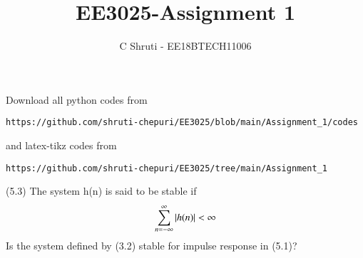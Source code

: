 \documentclass[journal,12pt,twocolumn]{IEEEtran}
\begin{document}
\def\rightbox#1{\makebox[0in][r]{#1}}
\def\centbox#1{\makebox[0in]{#1}}
\def\topbox#1{\raisebox{-\baselineskip}[0in][0in]{#1}}
\def\midbox#1{\raisebox{-0.5\baselineskip}[0in][0in]{#1}}
\vspace{3cm}
\title{EE3025-Assignment 1}
\author{C Shruti - EE18BTECH11006}
\maketitle
\newpage
\bigskip
\renewcommand{\thefigure}{\theenumi}
\renewcommand{\thetable}{\theenumi}
Download all python codes from 
\begin{lstlisting}
https://github.com/shruti-chepuri/EE3025/blob/main/Assignment_1/codes
\end{lstlisting}
%
and latex-tikz codes from 
%
\begin{lstlisting}
https://github.com/shruti-chepuri/EE3025/tree/main/Assignment_1
\end{lstlisting}
(5.3) The system h(n) is said to be stable if 
\begin{align}
\sum_{n=-\infty}^{\infty} \left\vert h(n)\right\vert < \infty
\end{align} 
Is the system defined by (3.2) stable for impulse response in (5.1)?
\end{document}
